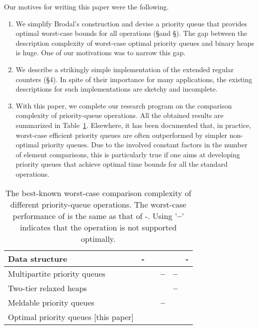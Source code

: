 \documentclass{llncs}
\newcommand{\Findmin}{\mbox{\mbox{\rm -}}}
\newcommand{\Insert}{\mbox{}}
\newcommand{\Deletemin}{\mbox{\mbox{\rm -}}}
\newcommand{\Decrease}{\mbox{}}
\newcommand{\Delete}{\mbox{}}
\newcommand{\Meld}{\mbox{}}
\begin{document}
Our motives for writing this paper were the following. 
\begin{enumerate}
\item We simplify Brodal's construction and devise a priority queue
  that provides optimal worst-case bounds for all operations (\S  and \S ). 
The gap between the description complexity of worst-case optimal priority queues 
  and binary heaps \cite{Wil64} is huge.  One of our motivations was to narrow this gap.
\item We describe a strikingly simple implementation of the extended regular counters (\S 4).  
  In spite of their importance for many applications, the existing descriptions \cite{CK77,KST02}
  for such implementations are sketchy and incomplete. 
\item With this paper, we complete our research program on the
  comparison complexity of priority-queue operations. All the obtained
  results are summarized in Table~\ref{table:results}.  Elsewhere, it
  has been documented that, in practice, worst-case efficient priority
  queues are often outperformed by simpler non-optimal priority queues.
  Due to the involved constant factors in the number of element comparisons, 
  this is particularly true if one aims at developing priority queues that 
  achieve optimal time bounds for all the standard operations.
\end{enumerate} 

\begin{table}[tb]
\caption{The best-known worst-case comparison complexity of different 
	priority-queue operations. The worst-case performance of \Delete{} is the same as 
	that of \Deletemin{}. 
	Using '\textbf{--}' indicates that the operation is not supported optimally.
\label{table:results}}
  
\begin{center}
\begin{tabular}{@{}|p{5.5cm}|c|c|c|c|c|@{}}
\hline
\textbf{Data structure} 
& \Findmin{}
& \Insert{}
& \Decrease{}
& \Meld{}
& \Deletemin{}\\
\hline
Multipartite priority queues \cite{EJK08b}
& 
& 
& \textbf{--}
& \textbf{--}
& \\
\hline
Two-tier relaxed heaps \cite{EJK08a}
& 
& 
& 
& \textbf{--}
& \\
\hline
Meldable priority queues \cite{EJK10b}
& 
& 
& \textbf{--}
& 
& \\
\hline
Optimal priority queues [this paper]
& 
& 
& 
& 
& \\
\hline
\end{tabular}
\end{center}
\vspace{-.2in}
\end{table}
\end{document}

